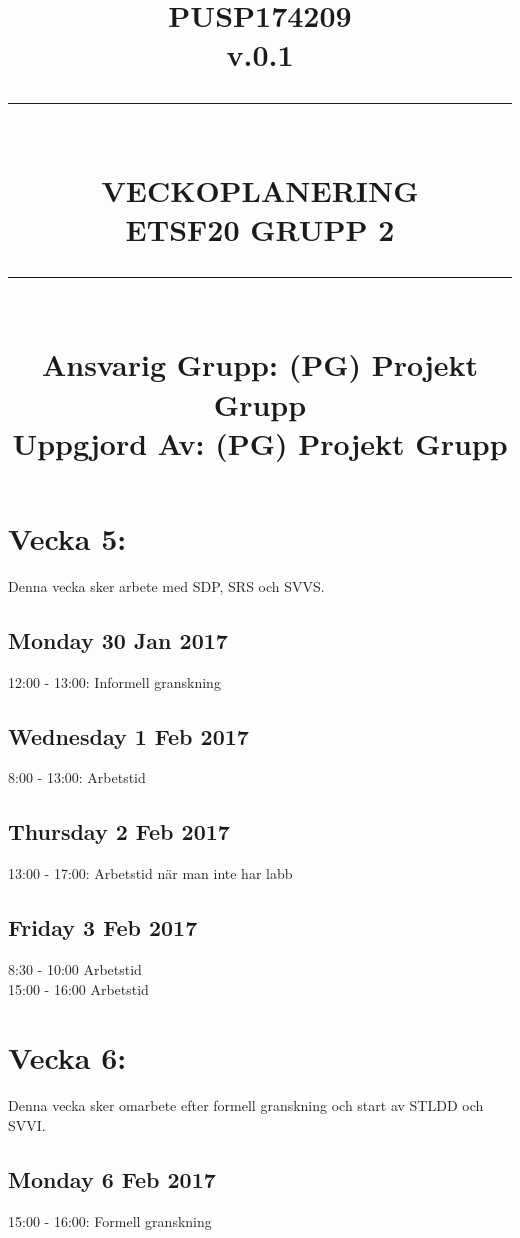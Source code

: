 \documentclass[paper=a4, fontsize=11pt,twoside]{article}
\title{
		\documentNumber{#1}																						
		\documentVersion{#2}																				
		\HRule{0.5pt} \\ %
		\LARGE \textbf{\uppercase{#3}} \\
		\large \textbf{\uppercase{ETSF20 Grupp 2}} 
		\HRule{2pt} \\ [1.5cm]    
		\normalsize            
		\documentResponsible{#4} \\ 
		\documentCreator{#4}  
	}
\newcommand{\HRule}[1]{\rule{\linewidth}{#1}}
\newcommand{\documentNumber}[1]{\centering PUSP1742#1 \\[1.0cm]}
\newcommand{\documentVersion}[1]{\centering \small{v.#1} \\[1.0cm]}
\newcommand{\documentResponsible}[1]{\centering  Ansvarig Grupp: #1}
\newcommand{\documentCreator}[1]{\centering Uppgjord Av: #1}
\newcommand{\grouptitlepage}[4]{ 
	\title{
		\documentNumber{#1}																						
		\documentVersion{#2}																				
		\HRule{0.5pt} \\ %
		\LARGE \textbf{\uppercase{#3}} \\
		\large \textbf{\uppercase{ETSF20 Grupp 2}} 
		\HRule{2pt} \\ [1.5cm]    
		\normalsize            
		\documentResponsible{#4} \\ 
		\documentCreator{#4}  
	}																							
	\maketitle																							
	\thispagestyle{empty} 																					
	\newpage 
}
\begin{document}
\grouptitlepage
{09}
{0.1}
{Veckoplanering}
{(PG) Projekt Grupp}



\section*{Vecka 5:}
Denna vecka sker arbete med SDP, SRS och SVVS.\\
\subsection*{Monday 30 Jan 2017}
	12:00 - 13:00: Informell granskning\\
\subsection*{Wednesday 1 Feb 2017}
	8:00 - 13:00: Arbetstid\\
\subsection*{Thursday 2 Feb 2017}
	13:00 - 17:00: Arbetstid när man inte har labb\\
\subsection*{Friday 3 Feb 2017}
	8:30 - 10:00 Arbetstid\\
	15:00 - 16:00 Arbetstid\\



\section*{Vecka 6:}
Denna vecka sker omarbete efter formell granskning och start av STLDD och
SVVI.\\
 \subsection*{Monday 6 Feb 2017}
	15:00 - 16:00: Formell granskning\\
\end{document}
